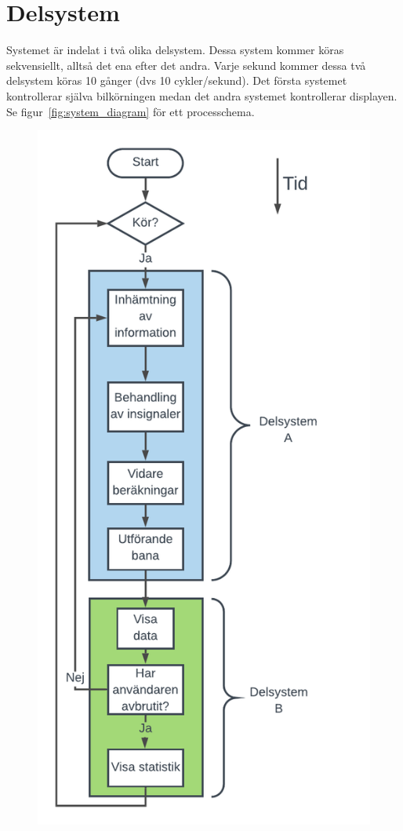 \section{Delsystem}

Systemet är indelat i två olika delsystem. Dessa system kommer köras
sekvensiellt, alltså det ena efter det andra. Varje sekund kommer dessa två delsystem köras 10 gånger (dvs 10 cykler/sekund). Det första systemet kontrollerar
själva bilkörningen medan det andra systemet kontrollerar displayen. Se
figur~\ref{fig:system_diagram} för ett processchema.

\begin{figure}
  \centering
  \includegraphics[width=\linewidth,height=0.9\textheight,keepaspectratio]{figures/Processchema.pdf}

\end{figure}
